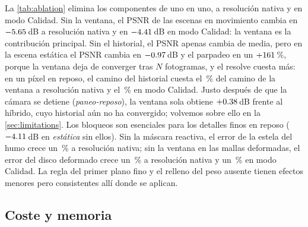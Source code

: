 \documentclass[11pt,a4paper]{article}
\begin{document}
La \cref{tab:ablation} elimina los componentes de uno en uno, a resolución nativa y en modo Calidad. Sin la ventana, el PSNR de las escenas en movimiento cambia en $-5.65$\,dB a resolución nativa y en $-4.41$\,dB en modo Calidad: la ventana es la contribución principal. Sin el historial, el PSNR apenas cambia de media, pero en la escena estática el PSNR cambia en $-0.97$\,dB y el parpadeo en un $+161$\,\%, porque la ventana deja de converger tras $N$ fotogramas, y el resolve cuesta más: en un píxel en reposo, el camino del historial cuesta el \nHistShareNat\,\% del camino de la ventana a resolución nativa y el \nHistShareQ\,\% en modo Calidad. Justo después de que la cámara se detiene (\emph{paneo-reposo}), la ventana sola obtiene $+0.38$\,dB frente al híbrido, cuyo historial aún no ha convergido; volvemos sobre ello en la \cref{sec:limitations}. Los bloqueos son esenciales para los detalles finos en reposo ($-4.11$\,dB en \emph{estática} sin ellos). Sin la máscara reactiva, el error de la estela del humo crece un \nAblNoReactiveTgtNatAbs\,\% a resolución nativa; sin la ventana en las mallas deformadas, el error del disco deformado crece un \nAblNoDeformedWindowTgtNatAbs\,\% a resolución nativa y un \nAblNoDeformedWindowTgtQAbs\,\% en modo Calidad. La regla del primer plano fino y el relleno del peso ausente tienen efectos menores pero consistentes allí donde se aplican.

\subsection{Coste y memoria}
\label{sec:cost}

\begin{table}[t]
\centering
\caption{Coste y memoria. HWTAA: tiempo estimado en una RX~590 (clase GTX~1060) con los píxeles en reposo y con toda la pantalla en movimiento, el peor caso; memoria en MB con el anillo, el historial, los bloqueos, los identificadores de objeto y la máscara reactiva. \textsuperscript{a}FSR~2.2: medido por AMD en una RX~590~\cite{amd2023fsr2}. \textsuperscript{b}FSR~3.1: cifras de AMD para una RX~5700~XT~\cite{amd2024fsr3,amd2025fsr31manual}, una GPU más rápida, solo como referencia.}
\label{tab:cost}
\small

\end{table}
\end{document}
